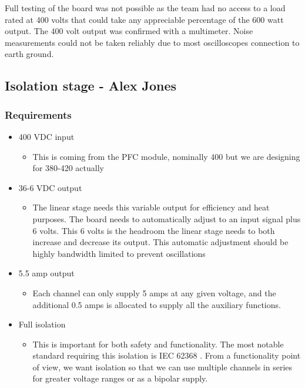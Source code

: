 \documentclass[15pt]{article}
\begin{document}
Full testing of the board was not possible as the team had no access to a load rated at 400 volts that could take any appreciable percentage of the 600 watt output. The 400 volt output was confirmed with a multimeter. Noise measurements could not be taken reliably due to most oscilloscopes connection to earth ground.

\subsection{Isolation stage  - Alex Jones}
\subsubsection{Requirements}
\begin{itemize}
\item 400 VDC input \begin{itemize}
    \item This is coming from the PFC module, nominally 400 but we are designing for 380-420 actually
\end{itemize}
\item 36-6 VDC output \begin{itemize}
    \item The linear stage needs this variable output for efficiency and heat purposes. The board needs to automatically adjust to an input signal plus 6 volts. This 6 volts is the headroom the linear stage needs to both increase and decrease its output. This automatic adjustment should be highly bandwidth limited to prevent oscillations
\end{itemize}
\item 5.5 amp output \begin{itemize}
    \item Each channel can only supply 5 amps at any given voltage, and the additional 0.5 amps is allocated to supply all the auxiliary functions.

\end{itemize}
\item Full isolation \begin{itemize}
    \item This is important for both safety and functionality. The most notable standard requiring this isolation is IEC 62368 \cite{5}. From a functionality point of view, we want isolation so that we can use multiple channels in series for greater voltage ranges or as a bipolar supply.
\end{itemize}
\end{itemize}
\end{document}
